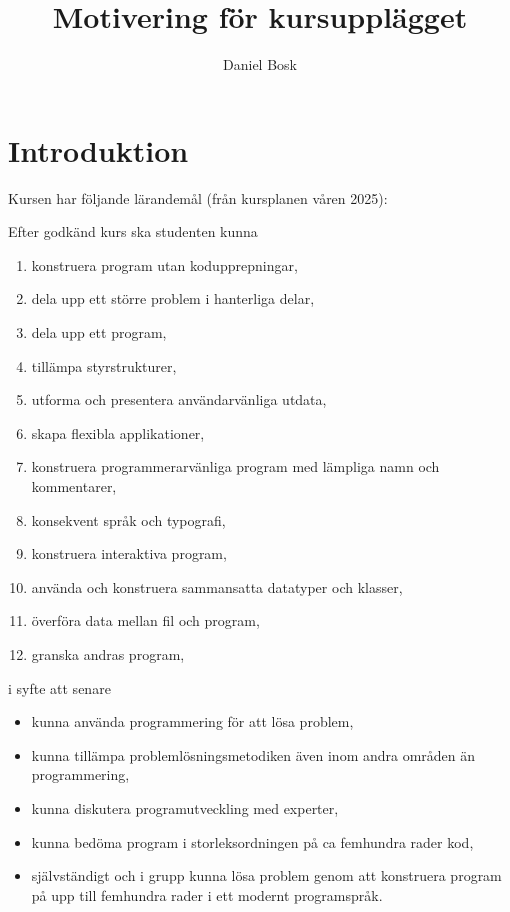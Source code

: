 \title{Motivering för kursupplägget}
\author{Daniel Bosk}

\mode*

\begin{frame}
  \maketitle
\end{frame}

\begin{abstract}
  
\end{abstract}

\begin{frame}
\end{frame}
\clearpage


\section{Introduktion}

Kursen har följande lärandemål (från kursplanen våren 2025):

Efter godkänd kurs ska studenten kunna
\begin{enumerate}
\item
  konstruera program utan kodupprepningar,
\item
  dela upp ett större problem i hanterliga delar,
\item
  dela upp ett program,
\item
  tillämpa styrstrukturer,
\item
  utforma och presentera användarvänliga utdata,
\item
  skapa flexibla applikationer,
\item
  konstruera programmerarvänliga program med lämpliga namn och
  kommentarer,
\item
  konsekvent språk och typografi,
\item
  konstruera interaktiva program,
\item
  använda och konstruera sammansatta datatyper och klasser,
\item
  överföra data mellan fil och program,
\item
  granska andras program,
\end{enumerate}
i syfte att senare
\begin{itemize}
\item
  kunna använda programmering för att lösa problem,
\item
  kunna tillämpa problemlösningsmetodiken även inom andra områden än
  programmering,
\item
  kunna diskutera programutveckling med experter,
\item
  kunna bedöma program i storleksordningen på ca femhundra rader kod,
\item
  självständigt och i grupp kunna lösa problem genom att konstruera
  program på upp till femhundra rader i ett modernt programspråk.
\end{itemize}
 
